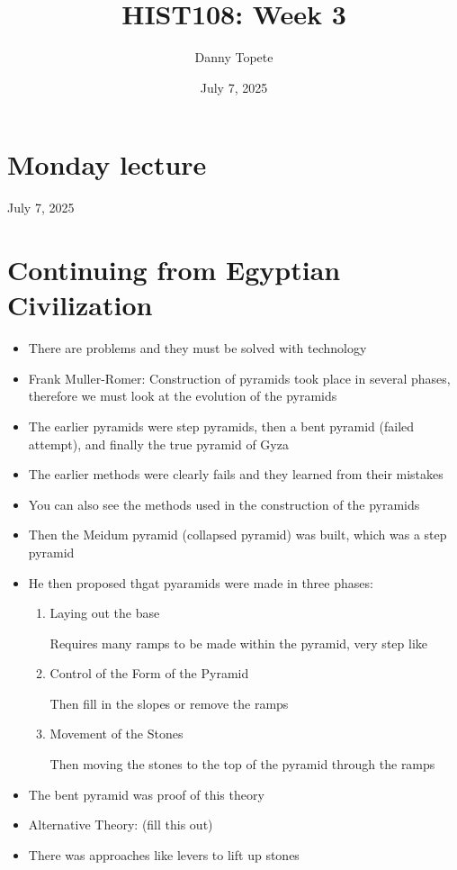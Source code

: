 \documentclass{article}
\title{HIST108: Week 3}
\author{Danny Topete}
\date{July 7, 2025}
\begin{document}
\maketitle

\section*{Monday lecture}
July 7, 2025

\section{Continuing from Egyptian Civilization}
\begin{itemize}
  \item There are problems and they must be solved with technology
  \item Frank Muller-Romer: Construction of pyramids took place in several phases,
    therefore we must look at the evolution of the pyramids
  \item The earlier pyramids were step pyramids, then a bent pyramid (failed attempt), and finally the true pyramid of Gyza
  \item The earlier methods were clearly fails and they learned from their mistakes
  \item You can also see the methods used in the construction of the pyramids
  \item Then the Meidum pyramid (collapsed pyramid) was built, which was a step pyramid
  \item He then proposed thgat pyaramids were made in three phases:
    \begin{enumerate}
      \item Laying out the base

        Requires many ramps to be made within the pyramid,
        very step like
      \item Control of the Form of the Pyramid

        Then fill in the slopes or remove the ramps
      \item Movement of the Stones

        Then moving the stones to the top of the pyramid through the ramps
    \end{enumerate}
  \item The bent pyramid was proof of this theory
  \item Alternative Theory: (fill this out)
  \item There was approaches like levers to lift up stones
\end{itemize}
\end{document}
